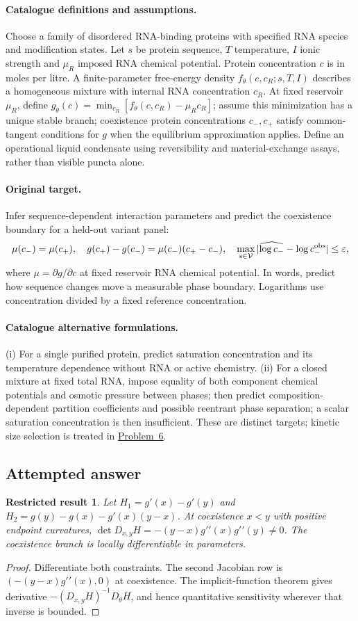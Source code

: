 \documentclass[11pt]{article}
\newtheorem{attemptresult}{Restricted result}[section]
\begin{document}
\paragraph{Catalogue definitions and assumptions.}
Choose a family of disordered RNA-binding proteins with specified RNA species and modification states. Let $s$ be protein sequence, $T$ temperature, $I$ ionic strength and $\mu_R$ imposed RNA chemical potential. Protein concentration $c$ is in moles per litre. A finite-parameter free-energy density $f_\theta(c,c_R;s,T,I)$ describes a homogeneous mixture with internal RNA concentration $c_R$. At fixed reservoir $\mu_R$, define $g_\theta(c)=\min_{c_R}[f_\theta(c,c_R)-\mu_Rc_R]$; assume this minimization has a unique stable branch; coexistence protein concentrations $c_-,c_+$ satisfy common-tangent conditions for $g$ when the equilibrium approximation applies. Define an operational liquid condensate using reversibility and material-exchange assays, rather than visible puncta alone.
\paragraph{Original target.}
Infer sequence-dependent interaction parameters and predict the coexistence boundary for a held-out variant panel:
\[
\mu(c_-)=\mu(c_+),\quad
g(c_+)-g(c_-)=\mu(c_-)(c_+-c_-),\quad
\max_{s\in\mathcal V}|\widehat{\log c_-}-\log c_-^{\rm obs}|\leq\varepsilon,
\]
where $\mu=\partial g/\partial c$ at fixed reservoir RNA chemical potential. In words, predict how sequence changes move a measurable phase boundary. Logarithms use concentration divided by a fixed reference concentration.
\paragraph{Catalogue alternative formulations.}
(i) For a single purified protein, predict saturation concentration and its temperature dependence without RNA or active chemistry. (ii) For a closed mixture at fixed total RNA, impose equality of both component chemical potentials and osmotic pressure between phases; then predict composition-dependent partition coefficients and possible reentrant phase separation; a scalar saturation concentration is then insufficient. These are distinct targets; kinetic size selection is treated in \href{https://we-solve.github.io/problems/nonequilibrium-condensates-897aba0c/}{Problem~6}.
\subsection{Attempted answer}
\begin{attemptresult}
Let $H_1=g\prime(x)-g\prime(y)$ and $H_2=g(y)-g(x)-g\prime(x)(y-x)$. At coexistence $x<y$ with positive endpoint curvatures, $\det D_{x,y}H=-(y-x)g\prime\prime(x)g\prime\prime(y)\ne0$. The coexistence branch is locally differentiable in parameters.
\end{attemptresult}
\begin{proof}
Differentiate both constraints. The second Jacobian row is $(-(y-x)g\prime\prime(x),0)$ at coexistence. The implicit-function theorem gives derivative $-(D_{x,y}H)^{-1}D_\theta H$, and hence quantitative sensitivity wherever that inverse is bounded.
\end{proof}
\end{document}
